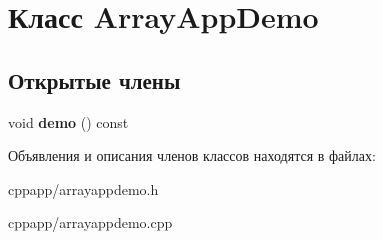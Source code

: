 \hypertarget{classArrayAppDemo}{}\section{Класс Array\+App\+Demo}
\label{classArrayAppDemo}
\subsection*{Открытые члены}
\begin{DoxyCompactItemize}
\item 
\hypertarget{classArrayAppDemo_a4f4d5f1f15f87f9b19cd42a097c63f35}{}void {\bfseries demo} () const \label{classArrayAppDemo_a4f4d5f1f15f87f9b19cd42a097c63f35}

\end{DoxyCompactItemize}


Объявления и описания членов классов находятся в файлах\+:\begin{DoxyCompactItemize}
\item 
cppapp/arrayappdemo.\+h\item 
cppapp/arrayappdemo.\+cpp\end{DoxyCompactItemize}
